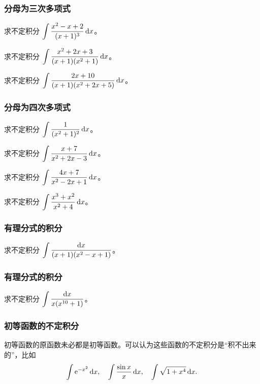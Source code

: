 \documentclass[14pt,notheorems,leqno,xcolor={rgb}]{beamer} %
\begin{document}
\begin{iframe}
\frametitle{分母为三次多项式}
\begin{example}
求不定积分 $\Int\dfrac{x^2-x+2}{(x+1)^3}\d x$。
\end{example}
\pause
\begin{example}
求不定积分 $\Int\dfrac{x^2+2x+3}{(x+1)(x^2+1)}\d x$。
\end{example}
\vpause
\begin{exercise}
求不定积分 $\Int\dfrac{2x+10}{(x+1)(x^2+2x+5)}\d x$。
\end{exercise}
\end{iframe}

\begin{iframe}
\frametitle{分母为四次多项式}
\begin{example}
求不定积分 $\Int\dfrac{1}{(x^2+1)^2}\d x$。
\end{example}
\end{iframe}


\begin{frame}
\begin{review}
求不定积分 $\Int\dfrac{x+7}{x^2+2x-3}\d x$。
\end{review}
\pause
\begin{review}
求不定积分 $\Int\dfrac{4x+7}{x^2-2x+1}\d x$。
\end{review}
\pause
\begin{review}
求不定积分 $\Int\dfrac{x^3+x^2}{x^2+4}\d x$。
\end{review}
\end{frame}

\begin{iframe}
\frametitle{有理分式的积分}
\begin{review}
求不定积分 $\Int\dfrac{\d x}{(x+1)(x^2-x+1)}$。
\end{review}
\end{iframe}

\begin{iframe}
\frametitle{有理分式的积分}
\begin{review}
求不定积分 $\Int\dfrac{\d x}{x(x^{10}+1)}$。
\end{review}
\end{iframe}

\begin{iframe}
\frametitle{初等函数的不定积分}
\begin{remark*}
初等函数的原函数未必都是初等函数。可以认为这些函数的不定积分是“积不出来的”，比如
$$\int \mathrm{e}^{-x^2}\mathop{}\!\mathrm{d} x,\quad \int\frac{\sin x}x \mathop{}\!\mathrm{d} x,\quad \int\sqrt{1+x^4}\mathop{}\!\mathrm{d} x.$$
\end{remark*}
\end{iframe}
\end{document}
